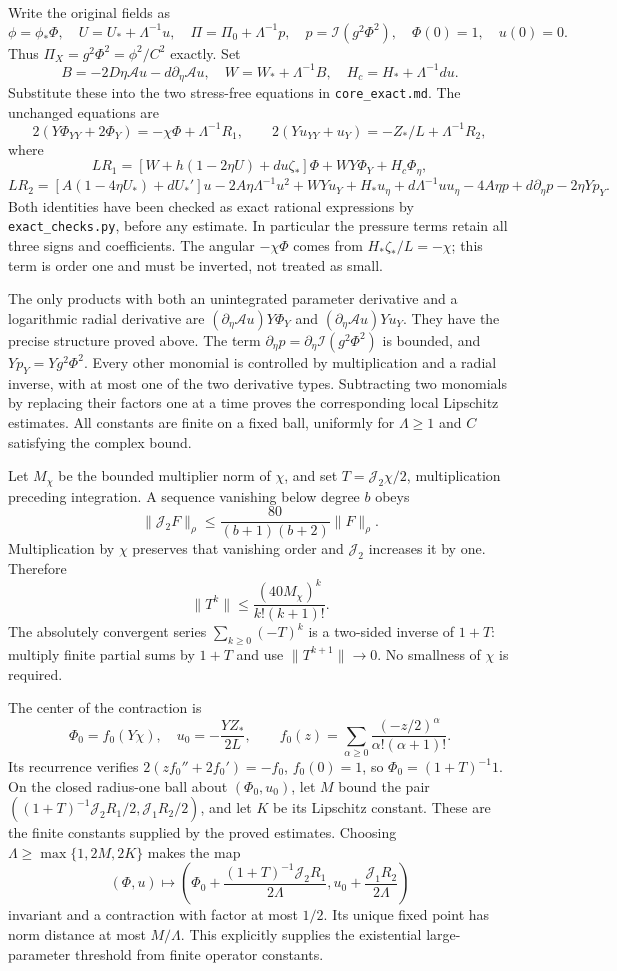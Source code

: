 \documentclass[10pt,a4paper]{article}
\begin{document}
Write the original fields as
\[
\phi=\phi_*\Phi,\quad U=U_*+\Lambda^{-1}u,
\quad \Pi=\Pi_0+\Lambda^{-1}p,
\quad p=\mathcal I(g^2\Phi^2),\quad \Phi(0)=1,\quad u(0)=0.
\]
Thus \(\Pi_X=g^2\Phi^2=\phi^2/C^2\) exactly. Set
\[
B=-2D\eta\mathcal A u-d\partial_\eta\mathcal A u,
\quad W=W_*+\Lambda^{-1}B,\quad H_c=H_*+\Lambda^{-1}du.
\]
Substitute these into the two stress-free equations in \texttt{core\_exact.md}. The unchanged equations are
\[
2(Y\Phi_{YY}+2\Phi_Y)=-\chi\Phi+\Lambda^{-1}R_1,
\qquad 2(Yu_{YY}+u_Y)=-Z_*/L+\Lambda^{-1}R_2,
\]
where
\[
LR_1=[W+h(1-2\eta U)+du\zeta_*]\Phi+WY\Phi_Y+H_c\Phi_\eta,
\]
\[
LR_2=[A(1-4\eta U_*)+dU_*']u-2A\eta\Lambda^{-1}u^2
+WYu_Y+H_*u_\eta+d\Lambda^{-1}uu_\eta
-4A\eta p+d\partial_\eta p-2\eta Yp_Y.
\]
Both identities have been checked as exact rational expressions by \texttt{exact\_checks.py}, before any estimate. In particular the pressure terms retain all three signs and coefficients. The angular \(-\chi\Phi\) comes from \(H_*\zeta_*/L=-\chi\); this term is order one and must be inverted, not treated as small.

The only products with both an unintegrated parameter derivative and a logarithmic radial derivative are \((\partial_\eta\mathcal A u)Y\Phi_Y\) and \((\partial_\eta\mathcal A u)Yu_Y\). They have the precise structure proved above. The term \(\partial_\eta p=\partial_\eta\mathcal I(g^2\Phi^2)\) is bounded, and \(Yp_Y=Yg^2\Phi^2\). Every other monomial is controlled by multiplication and a radial inverse, with at most one of the two derivative types. Subtracting two monomials by replacing their factors one at a time proves the corresponding local Lipschitz estimates. All constants are finite on a fixed ball, uniformly for \(\Lambda\ge1\) and \(C\) satisfying the complex bound.

Let \(M_\chi\) be the bounded multiplier norm of \(\chi\), and set \(T=\mathcal J_2\chi/2\), multiplication preceding integration. A sequence vanishing below degree \(b\) obeys
\[
\|\mathcal J_2F\|_\rho\le\frac{80}{(b+1)(b+2)}\|F\|_\rho.
\]
Multiplication by \(\chi\) preserves that vanishing order and \(\mathcal J_2\) increases it by one. Therefore
\[
\|T^k\|\le\frac{(40M_\chi)^k}{k!(k+1)!}.
\]
The absolutely convergent series \(\sum_{k\ge0}(-T)^k\) is a two-sided inverse of \(1+T\): multiply finite partial sums by \(1+T\) and use \(\|T^{k+1}\|\to0\). No smallness of \(\chi\) is required.

The center of the contraction is
\[
\Phi_0=f_0(Y\chi),\quad u_0=-\frac{YZ_*}{2L},
\qquad f_0(z)=\sum_{\alpha\ge0}\frac{(-z/2)^\alpha}{\alpha!(\alpha+1)!}.
\]
Its recurrence verifies \(2(zf_0''+2f_0')=-f_0\), \(f_0(0)=1\), so \(\Phi_0=(1+T)^{-1}1\). On the closed radius-one ball about \((\Phi_0,u_0)\), let \(M\) bound the pair
\(((1+T)^{-1}\mathcal J_2R_1/2,\mathcal J_1R_2/2)\), and let \(K\) be its Lipschitz constant. These are the finite constants supplied by the proved estimates. Choosing
\(\Lambda\ge\max\{1,2M,2K\}\) makes the map
\[
(\Phi,u)\longmapsto
\left(\Phi_0+\frac{(1+T)^{-1}\mathcal J_2R_1}{2\Lambda},
u_0+\frac{\mathcal J_1R_2}{2\Lambda}\right)
\]
invariant and a contraction with factor at most \(1/2\). Its unique fixed point has norm distance at most \(M/\Lambda\). This explicitly supplies the existential large-parameter threshold from finite operator constants.
\end{document}
